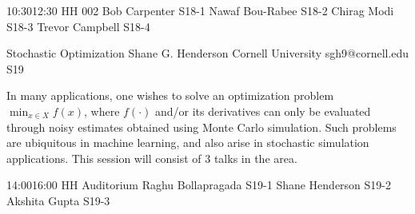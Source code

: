 \documentclass[12pt,lettersize,oneside]{book} %
\begin{document}

\sessionPart{}%
{\hfill{}
{10:30}{12:30} %
{HH 002}} %
{Bob Carpenter}
{S18-1}
{Nawaf Bou-Rabee}
{S18-2}
{Chirag Modi}
{S18-3}
{Trevor Campbell}
{S18-4}



\clearpage

\begin{session}
 {Stochastic Optimization}%
 {Shane G. Henderson}%
 {Cornell University}%
 {sgh9@cornell.edu}%
{}{}{}
 {S19}%
{}

 In many applications, one wishes to solve an optimization problem
 $\min_{x \in X} f(x)$, where $f(\cdot)$ and/or its derivatives can
 only be evaluated through noisy estimates obtained using Monte Carlo
 simulation. Such problems are ubiquitous in machine learning, and also
 arise in stochastic simulation applications. This session will consist
 of 3 talks in the area.
\end{session}



\sessionPart{}%
{\hfill{}
{14:00}{16:00} %
{HH Auditorium}} %
{Raghu Bollapragada}
{S19-1}
{Shane Henderson}
{S19-2}
{Akshita Gupta}
{S19-3}



\clearpage
\end{document}
